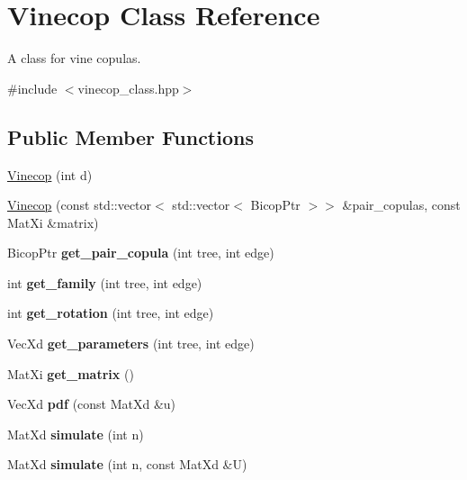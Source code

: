 \hypertarget{class_vinecop}{\section{Vinecop Class Reference}
\label{class_vinecop}
}


A class for vine copulas.  




{\ttfamily \#include $<$vinecop\+\_\+class.\+hpp$>$}

\subsection*{Public Member Functions}
\begin{DoxyCompactItemize}
\item 
\hyperlink{class_vinecop_ac2b043db375e4127234c066ba3b2412e}{Vinecop} (int d)
\item 
\hyperlink{class_vinecop_af7b728d1bc489c6c87e6afb31e82ac06}{Vinecop} (const std\+::vector$<$ std\+::vector$<$ Bicop\+Ptr $>$$>$ \&pair\+\_\+copulas, const Mat\+Xi \&matrix)
\item 
\hypertarget{class_vinecop_abd9dec1c010eec23f75ee0c8e52384bd}{Bicop\+Ptr {\bfseries get\+\_\+pair\+\_\+copula} (int tree, int edge)}\label{class_vinecop_abd9dec1c010eec23f75ee0c8e52384bd}

\item 
\hypertarget{class_vinecop_a30c95180a72665208e146a4202dcf3d9}{int {\bfseries get\+\_\+family} (int tree, int edge)}\label{class_vinecop_a30c95180a72665208e146a4202dcf3d9}

\item 
\hypertarget{class_vinecop_a8c2d5cc23ce33027d4024a4d7702e854}{int {\bfseries get\+\_\+rotation} (int tree, int edge)}\label{class_vinecop_a8c2d5cc23ce33027d4024a4d7702e854}

\item 
\hypertarget{class_vinecop_ae0b65eba272c6a2868d1db9f04e1fdbf}{Vec\+Xd {\bfseries get\+\_\+parameters} (int tree, int edge)}\label{class_vinecop_ae0b65eba272c6a2868d1db9f04e1fdbf}

\item 
\hypertarget{class_vinecop_aa1c2dcb66503749a66f40f2031d99e0b}{Mat\+Xi {\bfseries get\+\_\+matrix} ()}\label{class_vinecop_aa1c2dcb66503749a66f40f2031d99e0b}

\item 
\hypertarget{class_vinecop_af7cc5932cd21a4c8b07805ad79911a4f}{Vec\+Xd {\bfseries pdf} (const Mat\+Xd \&u)}\label{class_vinecop_af7cc5932cd21a4c8b07805ad79911a4f}

\item 
\hypertarget{class_vinecop_a2a234b3fdfd00e67cf27b5f3deb09873}{Mat\+Xd {\bfseries simulate} (int n)}\label{class_vinecop_a2a234b3fdfd00e67cf27b5f3deb09873}

\item 
\hypertarget{class_vinecop_a46ab3b783c58fdaa342c17812590d74b}{Mat\+Xd {\bfseries simulate} (int n, const Mat\+Xd \&U)}\label{class_vinecop_a46ab3b783c58fdaa342c17812590d74b}

\end{DoxyCompactItemize}
